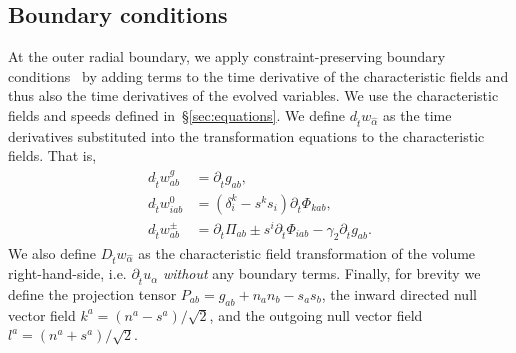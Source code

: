 \documentclass[12pt]{caltech_thesis}
\begin{document}
\begin{bibunit}[unsrtnat]
\subsection{Boundary conditions\label{sec:boundary conditions}}

At the outer radial boundary, we apply constraint-preserving boundary
conditions~\cite{Lindblom:2005qh, Rinne:2007ui} by adding terms to the time
derivative of the characteristic fields and thus also the time derivatives of
the evolved variables. We use the characteristic fields and speeds defined
in~\S\ref{sec:equations}. We define $d_{\hat{t}} w_{\hat{\alpha}}$ as the time
derivatives substituted into the transformation equations to the characteristic
fields. That is,
\begin{eqnarray}
  \label{eq:fosh gh dtw g}
  d_{\hat{t}}w^{g}_{ab} &= \partial_{\hat{t}} g_{ab}, \\
  \label{eq:fosh gh dtw 0}
  d_{\hat{t}} w^{0}_{iab} &= (\delta^k_i-s^k s_i)\partial_{\hat{t}} \Phi_{kab},
  \\
  \label{eq:fosh gh dtw pm}
  d_{\hat{t}} w^{\pm}_{ab} &= \partial_{\hat{t}} \Pi_{ab}\pm
                             s^i\partial_{\hat{t}} \Phi_{iab}
                             -\gamma_2\partial_{\hat{t}} g_{ab}.
\end{eqnarray}
We also define $D_{\hat{t}} w_{\hat{\alpha}}$ as the characteristic field
transformation of the volume right-hand-side, i.e. $\partial_{\hat{t}} u_\alpha$
\textit{without} any boundary terms. Finally, for brevity we define the
projection tensor $P_{ab}=g_{ab}+n_a n_b-s_as_b$, the inward directed null
vector field $k^a=(n^a-s^a)/\sqrt{2}$, and the outgoing null vector field
$l^a=(n^a+s^a)/\sqrt{2}$.


\end{bibunit}
\end{document}
